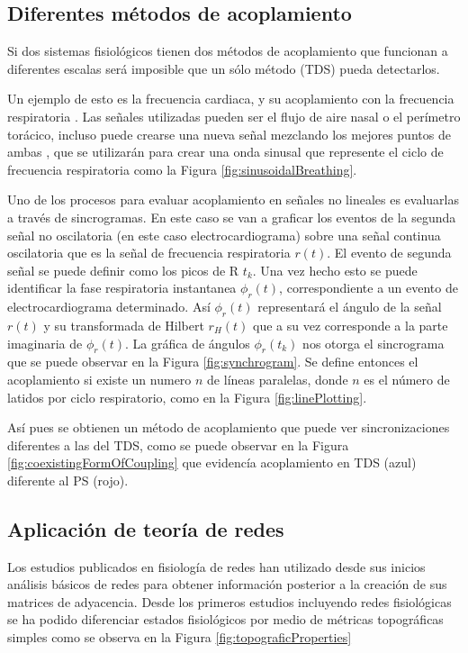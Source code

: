 \documentclass[twoside,twocolumn]{article}
\begin{document}
\subsection{Diferentes métodos de acoplamiento}
Si dos sistemas fisiológicos tienen dos métodos de acoplamiento que funcionan a diferentes escalas será imposible que un sólo método (TDS) pueda detectarlos.

Un ejemplo de esto es la frecuencia cardiaca, y su acoplamiento con la frecuencia respiratoria \cite{bartsch2014coexisting}.
Las señales utilizadas pueden ser el flujo de aire nasal o el perímetro torácico, incluso puede crearse una nueva señal mezclando los mejores puntos de ambas \cite{bartsch2014coexisting}, que se utilizarán para crear una onda sinusal que represente el ciclo de frecuencia respiratoria como la Figura \ref{fig:sinusoidalBreathing}.

Uno de los procesos para evaluar acoplamiento en señales no lineales es evaluarlas a través de sincrogramas.
En este caso se van a graficar los eventos de la segunda señal no oscilatoria (en este caso electrocardiograma) sobre una señal continua oscilatoria que es la señal de frecuencia respiratoria $r(t)$. El evento de segunda señal se puede definir como los picos de R $t_k$.
Una vez hecho esto se puede identificar la fase respiratoria instantanea $\phi_r(t)$, correspondiente a un evento de electrocardiograma determinado. Así  $\phi_r(t)$ representará el ángulo de la señal $r(t)$ y su transformada de Hilbert $r_H(t)$ que a su vez corresponde a la parte imaginaria de $\phi_r(t)$.
La gráfica de ángulos $\phi_r(t_k)$ nos otorga el sincrograma que se puede observar en la Figura \ref{fig:synchrogram}. Se define entonces el acoplamiento si existe un numero $n$ de líneas paralelas, donde $n$ es el número de latidos por ciclo respiratorio, como en la Figura \ref{fig:linePlotting}.

Así pues se obtienen un método de acoplamiento que puede ver sincronizaciones diferentes a las del TDS, como se puede observar en la Figura \ref{fig:coexistingFormOfCoupling} que evidencía acoplamiento en TDS (azul) diferente al PS (rojo).

\subsection{Aplicación de teoría de redes}
Los estudios publicados en fisiología de redes han utilizado desde sus inicios análisis básicos de redes para obtener información posterior a la creación de sus matrices de adyacencia.
Desde los primeros estudios incluyendo redes fisiológicas se ha podido diferenciar estados fisiológicos por medio de métricas topográficas simples como se observa en la Figura \ref{fig:topograficProperties}
\end{document}
